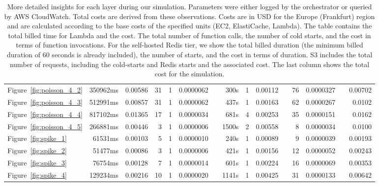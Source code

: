 \begin{landscape}
\begin{table*}[ht!]
\begin{adjustbox}{max width=\linewidth}
\begin{tabular}{ @{} l r r r r r c r r r c r r c r @{}}
        Figure~\ref{fig:poisson_4_2} &  350962ms & 0.00586 & 31 & 1 & 0.0000062 && 300s  & 1 & 0.00112 && 76  & 0.0000327 && 0.00702 \\
        Figure~\ref{fig:poisson_4_3} &  512991ms & 0.00857 & 31 & 1 & 0.0000062 && 437s  & 1 & 0.00163 && 62  & 0.0000267 && 0.0102 \\
        Figure~\ref{fig:poisson_4_4} &  817102ms & 0.01365 & 17 & 1 & 0.0000034 && 681s  & 4 & 0.00253 && 35  & 0.0000151 && 0.0162 \\
        Figure~\ref{fig:poisson_4_5} &  266881ms & 0.00446 & 3 &  1 & 0.0000006 && 1500s & 2 & 0.00558 && 8   & 0.0000034 && 0.0100 \\
        Figure~\ref{fig:spike_1} &      61531ms &  0.00103 & 5 &  1 & 0.0000010 && 240s  & 1 & 0.00089 && 9   & 0.0000039 && 0.00193 \\
        Figure~\ref{fig:spike_2} &      51477ms &  0.00086 & 3 &  1 & 0.0000006 && 421s  & 1 & 0.00156 && 12  & 0.0000052 && 0.00243 \\
        Figure~\ref{fig:spike_3} &      76754ms &  0.00128 & 7 &  1 & 0.0000014 && 601s  & 1 & 0.00224 && 16  & 0.0000069 && 0.00353 \\
        Figure~\ref{fig:spike_4} &      129234ms & 0.00216 & 10 & 1 & 0.0000020 && 1141s & 1 & 0.00425 && 31  & 0.0000133 && 0.00642 \\
        \bottomrule
        \end{tabular}
        \end{adjustbox}
        \caption{More detailed insights for each layer during our simulation. Parameters were either logged by the orchestrator or queried by AWS CloudWatch. Total costs are derived from these observations. Costs are in USD for the Europe (Frankfurt) region and are calculated according to the base costs of the specified units (EC2, ElastiCache, Lambda). The table contains the total billed time for Lambda and the cost. The total number of function calls, the number of cold starts, and the cost in terms of function invocations. For the self-hosted Redis tier, we show the total billed duration (the minimum billed duration of 60 seconds is already included), the number of starts, and the cost in terms of duration. S3 includes the total number of requests, including the cold-starts and Redis starts and the associated cost. The last column shows the total cost for the simulation.}
        \label{tab:costs}
    \end{table*}
\end{landscape}

